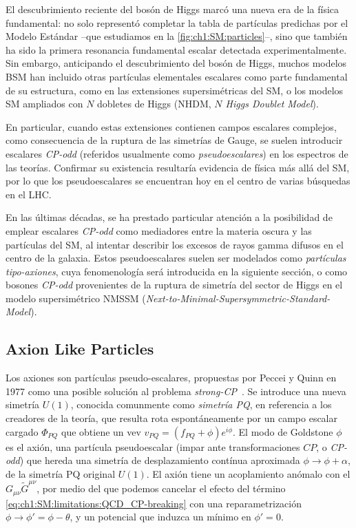 El descubrimiento reciente del bosón de Higgs marcó una nueva era de la física fundamental: no solo representó completar la tabla de partículas predichas por el Modelo Estándar --que estudiamos en la \cref{fig:ch1:SM:particles}--, sino que también ha sido la primera resonancia fundamental escalar detectada experimentalmente. Sin embargo, anticipando el descubrimiento del bosón de Higgs, muchos modelos BSM han incluido otras partículas elementales escalares como parte fundamental de su estructura, como en las extensiones supersimétricas del SM, o los modelos SM ampliados con $N$ dobletes de Higgs (NHDM, \textit{$N$ Higgs Doublet Model}).

En particular, cuando estas extensiones contienen campos escalares complejos, como consecuencia de la ruptura de las simetrías de Gauge, se suelen introducir escalares \textit{CP-odd} (referidos usualmente como \textit{pseudoescalares}) en los espectros de las teorías. Confirmar su existencia resultaría evidencia de física más allá del SM, por lo que los pseudoescalares se encuentran hoy en el centro de varias búsquedas en el LHC.

En las últimas décadas, se ha prestado particular atención a la posibilidad de emplear escalares \textit{CP-odd} como mediadores entre la materia oscura y las partículas del SM, al intentar describir los excesos de rayos gamma difusos en el centro de la galaxia. Estos pseudoescalares suelen ser modelados como \textit{partículas tipo-axiones}, cuya fenomenología será introducida en la siguiente sección, o como bosones \textit{CP-odd} provenientes de la ruptura de simetría del sector de Higgs en el modelo supersimétrico NMSSM (\textit{Next-to-Minimal-Supersymmetric-Standard-Model})\cites[-1em][]{Cheung2014}{Huang2014}.


\subsection{Axion Like Particles}

Los axiones son partículas pseudo-escalares, propuestas por Peccei y Quinn en 1977 como una posible solución al problema \textit{strong-CP}~\cite{Peccei1977,Peccei1977a}. Se introduce una nueva simetría $U(1)$, conocida comunmente como \textit{simetría PQ}, en referencia a los creadores de la teoría, que resulta rota espontáneamente por un campo escalar cargado $\Phi_{PQ}$ que obtiene un vev $v_{PQ} = (f_{PQ} + \phi) e^{i\phi}$. El modo de Goldstone $\phi$ es el axión, una partícula pseudoescalar (impar ante transformaciones $CP$, o \textit{CP-odd}) que hereda una simetría de desplazamiento contínua aproximada $\phi \to \phi + \alpha$, de la simetría PQ original $U(1)$. El axión tiene un acoplamiento anómalo con el $G_{\mu\nu} \tilde{G}^{\mu\nu}$, por medio del que podemos cancelar el efecto del término \eqref{eq:ch1:SM:limitations:QCD_CP-breaking} con una reparametrización $\phi \to \phi' = \phi - \theta$, y un potencial que induzca un mínimo en $\phi' = 0$.

